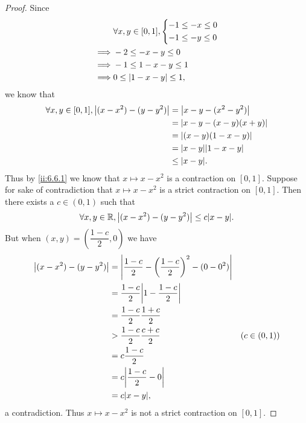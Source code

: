 \begin{proof}
  Since
  \begin{align*}
             & \forall x, y \in [0, 1], \begin{dcases}
                                          -1 \leq -x \leq 0 \\
                                          -1 \leq -y \leq 0
                                        \end{dcases} \\
    \implies & -2 \leq -x - y \leq 0                      \\
    \implies & -1 \leq 1 - x - y \leq 1                   \\
    \implies & 0 \leq \left\lvert1 - x - y\right\rvert \leq 1,
  \end{align*}
  we know that
  \begin{align*}
    \forall x, y \in [0, 1], \abs{(x - x^2) - (y - y^2)} & = \abs{x - y - (x^2 - y^2)}    \\
                                                         & = \abs{x - y - (x - y)(x + y)} \\
                                                         & = \abs{(x - y)(1 - x - y)}     \\
                                                         & = \abs{x - y} \abs{1 - x - y}  \\
                                                         & \leq \abs{x - y}.
  \end{align*}
  Thus by \cref{ii:6.6.1} we know that \(x \mapsto x - x^2\) is a contraction on \([0, 1]\).
  Suppose for sake of contradiction that \(x \mapsto x - x^2\) is a strict contraction on \([0, 1]\).
  Then there exists a \(c \in (0, 1)\) such that
  \[
    \forall x, y \in \R, \abs{(x - x^2) - (y - y^2)} \leq c \abs{x - y}.
  \]
  But when \((x, y) = (\dfrac{1 - c}{2}, 0)\) we have
  \begin{align*}
    \abs{(x - x^2) - (y - y^2)} & = \abs{\dfrac{1 - c}{2} - \bigg(\dfrac{1 - c}{2}\bigg)^2 - (0 - 0^2)}                  \\
                                & = \dfrac{1 - c}{2} \abs{1 - \dfrac{1 - c}{2}}                                          \\
                                & = \dfrac{1 - c}{2} \dfrac{1 + c}{2}                                                    \\
                                & > \dfrac{1 - c}{2} \dfrac{c + c}{2}                                   & (c \in (0, 1)) \\
                                & = c \dfrac{1 - c}{2}                                                                   \\
                                & = c \abs{\dfrac{1 - c}{2} - 0}                                                         \\
                                & = c \abs{x - y},
  \end{align*}
  a contradiction.
  Thus \(x \mapsto x - x^2\) is not a strict contraction on \([0, 1]\).
\end{proof}

